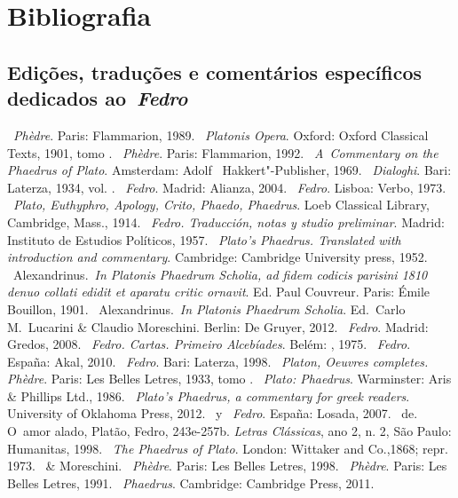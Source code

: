 \chapter{Bibliografia}

\section{Edições, traduções e comentários específicos dedicados
ao~\emph{Fedro}}

 

\begin{bibliohedra}
~\emph{Phèdre}. Paris: Flammarion, 1989.
~\emph{Platonis Opera}. Oxford: Oxford Classical
  Texts, 1901, tomo .
~\emph{Phèdre}. Paris: Flammarion, 1992.
~\emph{A~Commentary on the Phaedrus of Plato}.
  Amsterdam: Adolf ~Hakkert"-Publisher, 1969.
~\emph{Dialoghi}. Bari: Laterza, 1934, vol. .
~\emph{Fedro}. Madrid: Alianza, 2004.
~\emph{Fedro}. Lisboa: Verbo, 1973.
~\emph{Plato, Euthyphro, Apology, Crito, Phaedo, Phaedrus}. Loeb
  Classical Library, Cambridge, Mass., 1914.
~\emph{Fedro. Traducción, notas y studio preliminar}.
  Madrid: Instituto de Estudios Políticos, 1957.
~\emph{Plato's Phaedrus. Translated with introduction
  and commentary}. Cambridge: Cambridge University press, 1952.
~Alexandrinus.~\emph{In Platonis Phaedrum Scholia, ad fidem
  codicis parisini 1810 denuo collati edidit et aparatu critic ornavit}.
  Ed. Paul Couvreur. Paris: Émile Bouillon, 1901.
~Alexandrinus.~\emph{In Platonis Phaedrum Scholia}. Ed.~Carlo
  M.~Lucarini \& Claudio Moreschini. Berlin: De Gruyer,
  2012.
~\emph{Fedro}. Madrid: Gredos, 2008.
~\emph{Fedro. Cartas. Primeiro Alcebíades}.
  Belém: , 1975.
~\emph{Fedro}. España: Akal,
  2010.
~\emph{Fedro}. Bari: Laterza, 1998.
~\emph{Platon, Oeuvres completes. Phèdre}.
  Paris: Les Belles Letres, 1933, tomo .
~\emph{Plato: Phaedrus}. Warminster: Aris \& Phillips Ltd., 1986.
~\emph{Plato's Phaedrus, a commentary for greek readers}.
  University of Oklahoma Press, 2012.
~y ~\emph{Fedro}. España: Losada, 2007.
~de. O~amor alado, Platão, Fedro, 243e-257b.
  \emph{Letras Clássicas}, ano 2, n. 2, São Paulo: Humanitas, 1998.
~\emph{The Phaedrus of Plato}. London: Wittaker and Co.,1868; repr. 1973.
~\& Moreschini. ~\emph{Phèdre}. Paris: Les Belles Letres,
  1998.
~\emph{Phèdre}. Paris: Les Belles Letres, 1991.
~\emph{Phaedrus}. Cambridge:
  Cambridge Press, 2011.
\end{bibliohedra}

